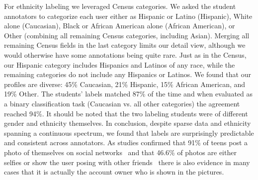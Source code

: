 For ethnicity labeling we leveraged Census categories. We asked the student annotators to categorize each user either as Hispanic or Latino (Hispanic), White alone (Caucasian), Black or African American alone (African American), or Other (combining all remaining Census categories, including Asian). Merging all remaining Census fields in the last category limits our detail view, although we would otherwise have some annotations being quite rare. Just as in the Census, our Hispanic category includes Hispanics and Latinos of any race, while the remaining categories do not include any Hispanics or Latinos. We found that our profiles are diverse: 45\% Caucasian, 21\% Hispanic, 15\% African American, and 19\% Other. The students' labels matched 87\% of the time and when evaluated as a binary classification task (Caucasian vs. all other categories) the agreement reached 94\%. It should be noted that the two labeling students were of different gender and ethnicity themselves. In conclusion, despite sparse data and ethnicity spanning a continuous spectrum, we found that labels are surprisingly predictable and consistent across annotators. As studies confirmed that 91\% of teens post a photo of themselves on social networks~\cite{PewTeen} and that 46.6\% of photos are either selfies or show the user posing with other friends~\cite{ICWSM148118} there is also evidence in many cases that it is actually the account owner who is shown in the pictures.

